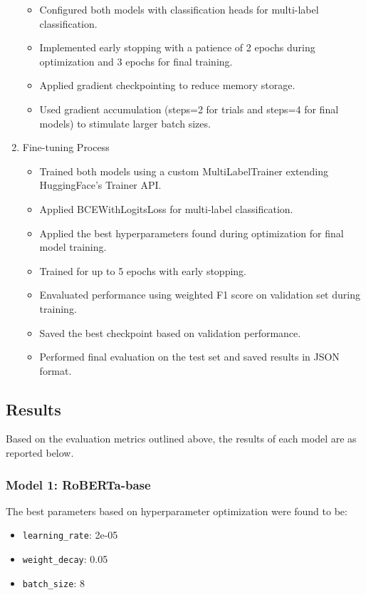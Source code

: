 \documentclass[titlepage]{article}
\begin{document}
\begin{enumerate}
        \begin{itemize}
            \item Configured both models with classification heads for multi-label classification.
            \item Implemented early stopping with a patience of 2 epochs during optimization and 3 epochs for final training.
            \item Applied gradient checkpointing to reduce memory storage.
            \item Used gradient accumulation (steps=2 for trials and steps=4 for final models) to stimulate larger batch sizes.
        \end{itemize}
    \item Fine-tuning Process 
        \begin{itemize}
            \item Trained both models using a custom MultiLabelTrainer extending HuggingFace's Trainer API.
            \item Applied BCEWithLogitsLoss for multi-label classification.
            \item Applied the best hyperparameters found during optimization for final model training.
            \item Trained for up to 5 epochs with early stopping.
            \item Envaluated performance using weighted F1 score on validation set during training.
            \item Saved the best checkpoint based on validation performance.
            \item Performed final evaluation on the test set and saved results in JSON format.
        \end{itemize}
\end{enumerate}

\subsection{Results}
Based on the evaluation metrics outlined above, the results of each model are as reported below.

\subsubsection{Model 1: RoBERTa-base}
The best parameters based on hyperparameter optimization were found to be:
\begin{itemize}
    \item \texttt{learning\_rate}: 2e-05
    \item \texttt{weight\_decay}: 0.05
    \item \texttt{batch\_size}: 8
\end{itemize}
\end{document}
